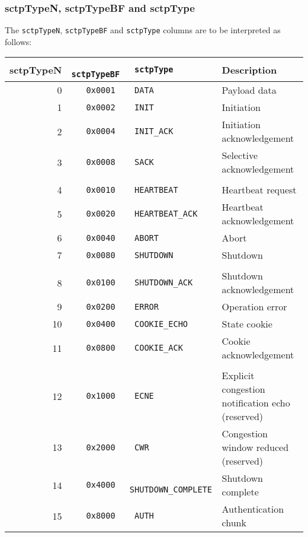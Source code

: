 \documentclass[documentation]{subfiles}
\begin{document}
\subsubsection{sctpTypeN, sctpTypeBF and sctpType}\label{sctpType}
The {\tt sctpTypeN}, {\tt sctpTypeBF} and {\tt sctpType} columns are to be interpreted as follows:
\begin{longtable}{r>{\tt}r>{\tt}ll}
    \toprule
    {\bf sctpTypeN} & {\bf sctpTypeBF} & {\bf sctpType} & {\bf Description}\\
    \midrule\endhead%
     0 & 0x0001 & DATA               & Payload data\\
     1 & 0x0002 & INIT               & Initiation\\
     2 & 0x0004 & INIT\_ACK          & Initiation acknowledgement\\
     3 & 0x0008 & SACK               & Selective acknowledgement\\
     \\
     4 & 0x0010 & HEARTBEAT          & Heartbeat request\\
     5 & 0x0020 & HEARTBEAT\_ACK     & Heartbeat acknowledgement\\
     6 & 0x0040 & ABORT              & Abort\\
     7 & 0x0080 & SHUTDOWN           & Shutdown\\
     \\
     8 & 0x0100 & SHUTDOWN\_ACK      & Shutdown acknowledgement\\
     9 & 0x0200 & ERROR              & Operation error\\
    10 & 0x0400 & COOKIE\_ECHO       & State cookie\\
    11 & 0x0800 & COOKIE\_ACK        & Cookie acknowledgement\\
    \\
    12 & 0x1000 & ECNE               & Explicit congestion notification echo (reserved)\\
    13 & 0x2000 & CWR                & Congestion window reduced (reserved)\\
    14 & 0x4000 & SHUTDOWN\_COMPLETE & Shutdown complete\\
    15 & 0x8000 & AUTH               & Authentication chunk\\
    \bottomrule
\end{longtable}
\end{document}

